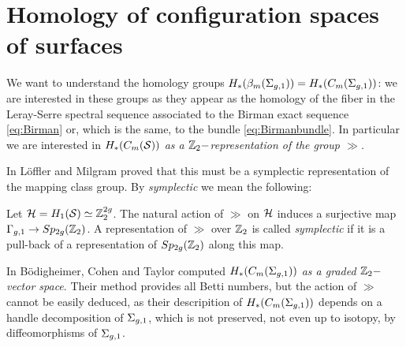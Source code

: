 \section{Homology of configuration spaces of surfaces}
We want to understand the homology groups $H_*(\bms)=H_*(C_m(\sg))$: we
are interested in these groups as they appear as the homology of the fiber
in the Leray-Serre spectral sequence associated to
the Birman exact sequence \ref{eq:Birman} or, which is the same, to the bundle
\ref{eq:Birmanbundle}. In particular we are interested in $H_*(C_m(\S))$
\emph{as a $\Z_2-$representation of the group $\gg$.}

In \cite{LM} L\"offler and Milgram proved that this must be a symplectic
representation of the mapping class group. By \emph{symplectic} we mean the following:
\begin{defn}
 \label{defn:symplrep}
 Let $\H=H_1(\S)\simeq\Z_2^{2g}$.
 The natural action of $\gg$ on $\H$ induces a surjective map
 $\gg\to Sp_{2g}(\Z_2)$. A representation of $\gg$ over $\Z_2$ is called \emph{symplectic}
 if it is a pull-back of a representation of $Sp_{2g}(\Z_2)$ along this map.
\end{defn}

In \cite{BCM} B\"odigheimer, Cohen and Taylor computed $H_*(C_m(\sg))$ \emph{as a graded $\Z_2-$vector space}.
Their method provides all Betti numbers, but the action of $\gg$ cannot be easily deduced, as
their descripition of $H_*(C_m(\sg))$ depends on a handle decomposition of $\sg$, which is not preserved,
not even up to isotopy, by diffeomorphisms of $\sg$.

